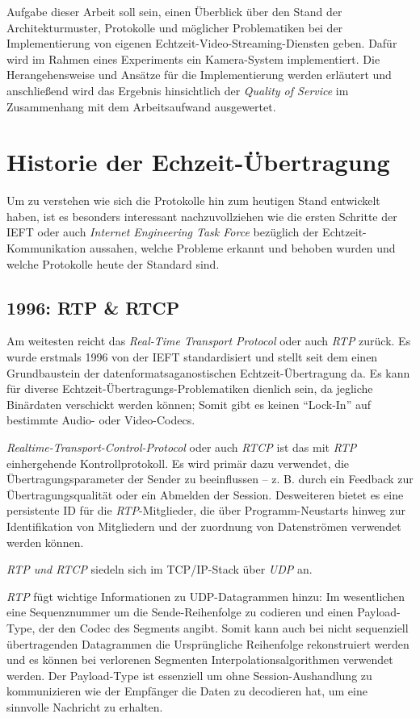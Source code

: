 \documentclass{article}
\begin{document}
\begin{onecolumn}
Aufgabe dieser Arbeit soll sein, einen Überblick über den Stand der
Architekturmuster, Protokolle und möglicher Problematiken bei der
Implementierung von eigenen Echtzeit-Video-Streaming-Diensten geben. Dafür
wird im Rahmen eines Experiments ein Kamera-System implementiert. Die
Herangehensweise und Ansätze für die Implementierung werden erläutert und 
anschließend wird das Ergebnis hinsichtlich der \textit{Quality of Service}
im Zusammenhang mit dem Arbeitsaufwand ausgewertet.

\section{Historie der Echzeit-Übertragung}

Um zu verstehen wie sich die Protokolle hin zum heutigen Stand entwickelt
haben, ist es besonders interessant nachzuvollziehen wie die ersten Schritte
der IEFT oder auch \textit{Internet Engineering Task Force} bezüglich der
Echtzeit-Kommunikation aussahen, welche Probleme erkannt und behoben wurden und
welche Protokolle heute der Standard sind.

\subsection{1996: RTP \& RTCP}

Am weitesten reicht das \textit{Real-Time Transport Protocol} oder auch
\textit{RTP} zurück. Es wurde erstmals 1996 von der IEFT standardisiert und
stellt seit dem einen Grundbaustein der datenformatsaganostischen
Echtzeit-Übertragung da. Es kann für diverse
Echtzeit-Übertragungs-Problematiken dienlich sein, da jegliche Binärdaten
verschickt werden können; Somit gibt es keinen ``Lock-In'' auf bestimmte Audio-
oder Video-Codecs.

\textit{Realtime-Transport-Control-Protocol} oder auch \textit{RTCP} ist das
mit \textit{RTP} einhergehende Kontrollprotokoll. Es wird primär dazu
verwendet, die Übertragungsparameter der Sender zu beeinflussen – z. B. durch
ein Feedback zur Übertragungsqualität oder ein Abmelden der Session.
Desweiteren bietet es eine persistente ID für die \textit{RTP}-Mitglieder, die
über Programm-Neustarts hinweg zur Identifikation von Mitgliedern und der
zuordnung von Datenströmen verwendet werden können.~\cite{RFC1889}

\textit{RTP und RTCP} siedeln sich im TCP/IP-Stack über \textit{UDP}
an.~\cite{RFC1889}

\textit{RTP} fügt wichtige Informationen zu UDP-Datagrammen hinzu: Im
wesentlichen eine Sequenznummer um die Sende-Reihenfolge zu codieren und einen
Payload-Type, der den Codec des Segments angibt. Somit kann auch bei nicht
sequenziell übertragenden Datagrammen die Ursprüngliche Reihenfolge
rekonstruiert werden und es können bei verlorenen Segmenten
Interpolationsalgorithmen verwendet werden. Der Payload-Type ist essenziell um
ohne Session-Aushandlung zu kommunizieren wie der Empfänger die Daten zu
decodieren hat, um eine sinnvolle Nachricht zu erhalten.


\end{onecolumn}
\end{document}
